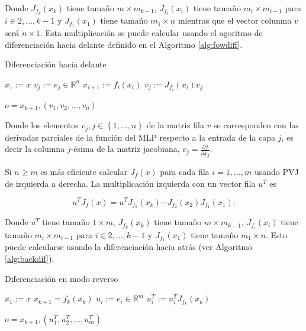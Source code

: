 Donde $J_{f_k}(x_k)$ tiene tamaño $m \times m_{k-1}$, $J_{f_i}(x_i)$ tiene tamaño $m_i \times m_{i-1}$ para $i \in {2,\ldots,k-1}$ y $J_{f_1}(x_1)$ tiene tamaño $m_1 \times n$ mientras que el vector columna $v$ será $n \times 1$. Esta multiplicación se puede calcular usando el agoritmo de diferenciación hacia delante definido en el Algoritmo \ref{alg:fowdiff}.

\begin{algorithm}[H]
\caption{Diferenciación hacia delante}
\label{alg:fowdiff}
    \begin{algorithmic}
        \State $x_1 := x$
            \State $v_j := e_j \in \mathbb{R}^n$
        \EndFor
            \State $x_{i+1}:=f_i(x_i)$
                \State $v_j:= J_{f_i}(x_i)v_j$
            \EndFor
        \EndFor 

        
         \Return $o=x_{k+1}, \left (v_1, v_2, \ldots, v_n \right )$
        
    \end{algorithmic}
\end{algorithm}

Donde los elementos $v_j, j \in \left \{1,\ldots,n \right \}$ de la matriz fila $v$ se corresponden con las derivadas parciales de la función del MLP respecto a la entrada de la capa $j$, es decir la columna $j$-ésima de la matriz jacobiana, $v_j=\frac{\partial f}{\partial x_j}$. 

Si $n\geq m$ es más eficiente calcular $J_f(x)$ para cada fila $i=1,\ldots,m$ usando PVJ de izquierda a derecha. La multiplicación izquierda con un vector fila $u^T$ es 

$$u^TJ_f(x)=u^TJ_{f_k}(x_k) \cdots J_{f_2}(x_2) J_{f_1}(x_1).$$

Donde $u^T$ tiene tamaño $1 \times m$,  $J_{f_k}(x_k)$ tiene tamaño $m \times m_{k-1}$, $J_{f_i}(x_i)$ tiene tamaño $m_i \times m_{i-1}$ para $i \in {2,\ldots,k-1}$ y $J_{f_1}(x_1)$ tiene tamaño $m_1 \times n$. Esto puede calcularse usando la diferenciación hacia atrás (ver Algoritmo \ref{alg:backdif}).

 


\begin{algorithm}
\caption{Diferenciación en modo reverso}
\label{alg:backdif}
    \begin{algorithmic}
        \State $x_1:=x$
            \State $x_{k+1} = f_k(x_k)$
        \EndFor
            \State $u_i:=e_i \in \mathbb{R}^m$
        \EndFor 
                \State $u_i^T:= u_i^T J_{f_k}(x_k)$
            \EndFor
        \EndFor 

        \Return $o=x_{k+1}, \left ( u_1^T, u_2^T, \ldots, u_m^T \right )$
    \end{algorithmic}
\end{algorithm}

